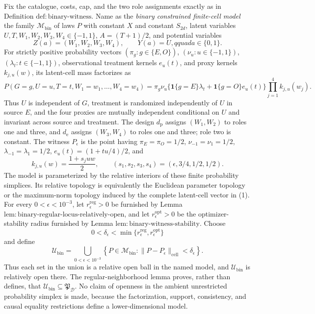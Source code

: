 Fix the catalogue, costs, cap, and the two role assignments exactly as in Definition \(\mathrm{def{:}binary\text{-}witness}\).  Name as the \emph{binary constrained finite-cell model} the family \(\mathcal M_{\mathrm{bin}}\) of laws \(P\) with constant \(X\) and constant \(S_{2d}\), latent variables \(U,T,W_1,W_2,W_3,W_4\in\{-1,1\}\), \(A=(T+1)/2\), and potential variables
\[
 Z(a)=(W_1,W_2,W_3,W_4),\qquad Y(a)=U,qquad a\in\{0,1\}.
\]
For strictly positive probability vectors \((\pi_g:g\in\{E,O\})\), \((\nu_u:u\in\{-1,1\})\), \((\lambda_t:t\in\{-1,1\})\), observational treatment kernels \(e_u(t)\), and proxy kernels \(k_{j,u}(w)\), its latent-cell mass factorizes as
\[
 P(G=g,U=u,T=t,W_1=w_1,\ldots,W_4=w_4)
 =\pi_g\nu_u
 \bigl\{\mathbf 1\{g=E\}\lambda_t+\mathbf 1\{g=O\}e_u(t)\bigr\}
 \prod_{j=1}^4 k_{j,u}(w_j).                                    \tag{1}
\]
Thus \(U\) is independent of \(G\), treatment is randomized independently of \(U\) in source \(E\), and the four proxies are mutually independent conditional on \(U\) and invariant across source and treatment.  The design \(d_{\mathrm p}\) assigns \((W_1,W_2)\) to roles one and three, and \(d_{\mathrm e}\) assigns \((W_3,W_4)\) to roles one and three; role two is constant.  The witness \(P_\epsilon\) is the point having \(\pi_E=\pi_O=1/2\), \(\nu_{-1}=\nu_1=1/2\), \(\lambda_{-1}=\lambda_1=1/2\), \(e_u(t)=(1+tu/4)/2\), and
\[
 k_{j,u}(w)=\frac{1+s_juw}{2},
 \qquad (s_1,s_2,s_3,s_4)=(\epsilon,3/4,1/2,1/2).
\]
The model is parameterized by the relative interiors of these finite probability simplices.  Its relative topology is equivalently the Euclidean parameter topology or the maximum-norm topology induced by the complete latent-cell vector in (1).  For every \(0<\epsilon<10^{-3}\), let \(r_\epsilon^{\mathrm{reg}}>0\) be furnished by Lemma \(\mathrm{lem{:}binary\text{-}regular\text{-}locus\text{-}relatively\text{-}open}\), and let \(r_\epsilon^{\mathrm{opt}}>0\) be the optimizer-stability radius furnished by Lemma \(\mathrm{lem{:}binary\text{-}witness\text{-}stability}\).  Choose
\[
 0<\delta_\epsilon<\min\{r_\epsilon^{\mathrm{reg}},r_\epsilon^{\mathrm{opt}}\}
\]
and define
\[
 \mathcal U_{\mathrm{bin}}
 =\bigcup_{0<\epsilon<10^{-3}}
 \left\{P\in\mathcal M_{\mathrm{bin}}:
 \|P-P_\epsilon\|_{\mathrm{cell}}<\delta_\epsilon\right\}.     \tag{2}
\]
Thus each set in the union is a relative open ball in the named model, and \(\mathcal U_{\mathrm{bin}}\) is relatively open there.  The regular-neighborhood lemma proves, rather than defines, that \(\mathcal U_{\mathrm{bin}}\subseteq\mathfrak P_{\mathcal D}\).  No claim of openness in the ambient unrestricted probability simplex is made, because the factorization, support, consistency, and causal equality restrictions define a lower-dimensional model.
